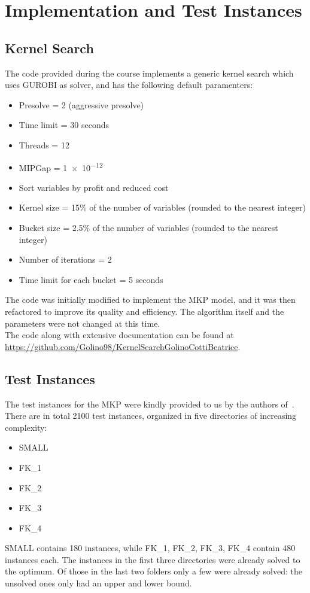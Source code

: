 \chapter{Implementation and Test Instances}


\section{Kernel Search}
The code provided during the course implements a generic kernel search
which uses GUROBI as solver, and has the following default paramenters:
\begin{itemize}
    \item Presolve = 2 (aggressive presolve)
    \item Time limit = 30 seconds
    \item Threads = 12
    \item MIPGap = \num{1e-12}
    \item Sort variables by profit and reduced cost
    \item Kernel size = 15\% of the number of variables (rounded to the nearest integer)
    \item Bucket size = 2.5\% of the number of variables (rounded to the nearest integer)
    \item Number of iterations = 2
    \item Time limit for each bucket = 5 seconds
\end{itemize}
The code was initially modified to implement the MKP model, and it was then
refactored to improve its quality and efficiency.
The algorithm itself and the parameters were not changed at this time.\\
The code along with extensive documentation can be found at
\url{https://github.com/Golino98/KernelSearchGolinoCottiBeatrice}.

\section{Test Instances}
The test instances for the MKP were kindly provided to us by the authors of~\cite{mkp:2019}.\\
There are in total 2100 test instances, organized in
five directories of increasing complexity:
\begin{itemize}
    \item SMALL
    \item FK\_1
    \item FK\_2
    \item FK\_3
    \item FK\_4
\end{itemize}
SMALL contains 180 instances, while FK\_1, FK\_2, FK\_3, FK\_4 contain 480 instances each.
The instances in the first three directories were already solved to the optimum.
Of those in the last two folders only a few were already solved: the unsolved
ones only had an upper and lower bound.
\newpage
